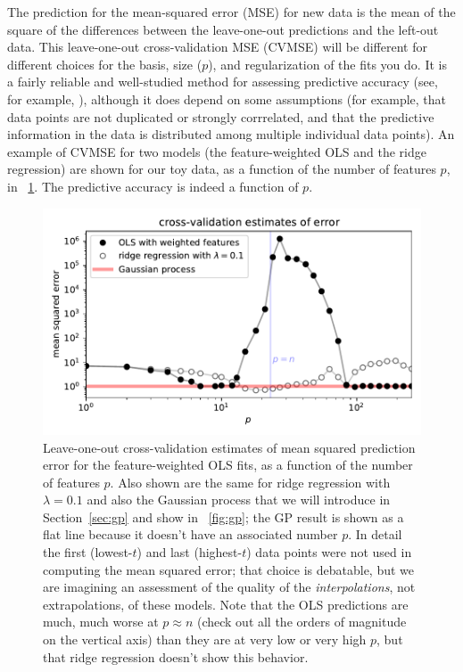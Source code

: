\documentclass[12pt,letterpaper]{article}
\newlength{\figurewidth}
\newcommand{\sectionname}{Section}
\begin{document}
The prediction for the mean-squared error (MSE) for new data is the mean of the square of the differences between the leave-one-out predictions and the left-out data.
This leave-one-out cross-validation MSE (CVMSE) will be different for different choices for the basis, size ($p$), and regularization of the fits you do.
It is a fairly reliable and well-studied method for assessing predictive accuracy (see, for example, \citealt{cv}), although it does depend on some assumptions (for example, that data points are not duplicated or strongly corrrelated, and that the predictive information in the data is distributed among multiple individual data points).
An example of CVMSE for two models (the feature-weighted OLS and the ridge regression) are shown for our toy data, as a function of the number of features $p$, in \figurename~\ref{fig:cv}.
The predictive accuracy is indeed a function of $p$.
\begin{figure}[t]
    \begin{mdframed}
    \includegraphics[width=\figurewidth]{paper/cross-validation.pdf}
    \caption{Leave-one-out cross-validation estimates of mean squared prediction error for the feature-weighted OLS fits, as a function of the number of features $p$. Also shown are the same for ridge regression with $\lambda=0.1$ and also the Gaussian process that we will introduce in \sectionname~\ref{sec:gp} and show in \figurename~\ref{fig:gp}; the GP result is shown as a flat line because it doesn't have an associated number $p$. In detail the first (lowest-$t$) and last (highest-$t$) data points were not used in computing the mean squared error; that choice is debatable, but we are imagining an assessment of the quality of the \emph{interpolations}, not extrapolations, of these models. Note that the OLS predictions are much, much worse at $p\approx n$ (check out all the orders of magnitude on the vertical axis) than they are at very low or very high $p$, but that ridge regression doesn't show this behavior.}
    \label{fig:cv}
    \end{mdframed}
\end{figure}
\end{document}
